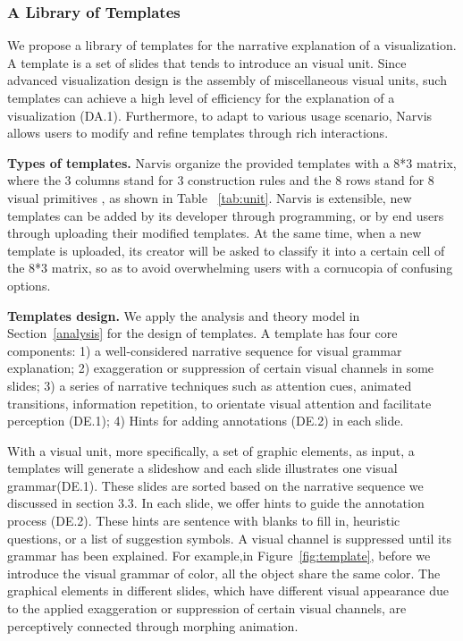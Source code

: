 \subsubsection{A Library of Templates}
We propose a library of templates for the narrative explanation of a visualization. A template is a set of slides that tends to introduce an visual unit. Since advanced visualization design is the assembly of miscellaneous visual units, such templates can achieve a high level of efficiency for the explanation of a visualization (DA.1). Furthermore, to adapt to various usage scenario, Narvis allows users to modify and refine templates through rich interactions.

\noindent
\textbf{Types of templates.}
Narvis organize the provided templates with a 8*3 matrix, where the 3 columns stand for 3 construction rules and the 8 rows stand for  8 visual primitives , as shown in Table ~\ref{tab:unit}. Narvis is extensible, new templates can be added by its developer through programming, or by end users through uploading their modified templates. At the same time, when a new template is uploaded, its creator will be asked to classify it into a certain cell of the 8*3 matrix, so as to avoid overwhelming users with a cornucopia of confusing options.

\noindent
\textbf{Templates design.}
We apply the analysis and theory model in Section~\ref{analysis} for the design of templates. A template has four core components: 1) a well-considered narrative sequence for visual grammar explanation; 2) exaggeration or suppression of certain visual channels in some slides; 3) a series of narrative techniques such as attention cues, animated transitions, information repetition, to orientate visual attention and facilitate perception (DE.1); 4) Hints for adding annotations (DE.2) in each slide. 

With a visual unit, more specifically, a set of graphic elements, as input, a templates will generate a slideshow and each slide illustrates one visual grammar(DE.1). These slides are sorted based on the narrative sequence we discussed in section 3.3. In each slide, we offer hints to guide the annotation process (DE.2). These hints are sentence with blanks to fill in, heuristic questions, or a list of suggestion symbols. A visual channel is suppressed until its grammar has been explained. For example,in Figure~\ref{fig:template}, before we introduce the visual grammar of color, all the object share the same color. The graphical elements in different slides, which have different visual appearance due to the applied exaggeration or suppression of certain visual channels, are perceptively connected through morphing animation. 

